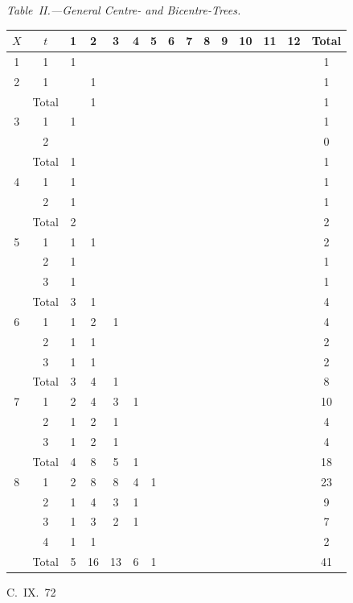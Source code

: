 \documentclass[11pt,a4paper]{book}
\begin{document}
{\textit{Table~II.---General Centre- and Bicentre-Trees.}
\begin{center}
\small
\begin{longtable}{|c|c|c|c|c|c|c|c|c|c|c|c|c|c|c|}
\hline
$X$ & $t$ & 1 & 2 & 3 & 4 & 5 & 6 & 7 & 8 & 9 & 10 & 11 & 12 & Total \\
\hline
\endfirsthead
1 & 1 & 1 & & & & & & & & & & & & 1 \\
\hline
2 & 1 & & 1 & & & & & & & & & & & 1 \\
  & Total & & 1 & & & & & & & & & & & 1 \\
\hline
3 & 1 & 1 & & & & & & & & & & & & 1 \\
  & 2 & & & & & & & & & & & & & 0 \\
  & Total & 1 & & & & & & & & & & & & 1 \\
\hline
4 & 1 & 1 & & & & & & & & & & & & 1 \\
  & 2 & 1 & & & & & & & & & & & & 1 \\
  & Total & 2 & & & & & & & & & & & & 2 \\
\hline
5 & 1 & 1 & 1 & & & & & & & & & & & 2 \\
  & 2 & 1 & & & & & & & & & & & & 1 \\
  & 3 & 1 & & & & & & & & & & & & 1 \\
  & Total & 3 & 1 & & & & & & & & & & & 4 \\
\hline
6 & 1 & 1 & 2 & 1 & & & & & & & & & & 4 \\
  & 2 & 1 & 1 & & & & & & & & & & & 2 \\
  & 3 & 1 & 1 & & & & & & & & & & & 2 \\
  & Total & 3 & 4 & 1 & & & & & & & & & & 8 \\
\hline
7 & 1 & 2 & 4 & 3 & 1 & & & & & & & & & 10 \\
  & 2 & 1 & 2 & 1 & & & & & & & & & & 4 \\
  & 3 & 1 & 2 & 1 & & & & & & & & & & 4 \\
  & Total & 4 & 8 & 5 & 1 & & & & & & & & & 18 \\
\hline
8 & 1 & 2 & 8 & 8 & 4 & 1 & & & & & & & & 23 \\
  & 2 & 1 & 4 & 3 & 1 & & & & & & & & & 9 \\
  & 3 & 1 & 3 & 2 & 1 & & & & & & & & & 7 \\
  & 4 & 1 & 1 & & & & & & & & & & & 2 \\
  & Total & 5 & 16 & 13 & 6 & 1 & & & & & & & & 41 \\
\hline
\end{longtable}
\end{center}
\hfill C.~IX.\ 72

}
\end{document}
